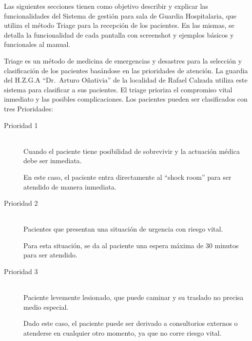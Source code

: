 Las siguientes secciones tienen como objetivo describir y explicar las funcionalidades del Sistema de gestión para sala de Guardia Hospitalaria, que utiliza el método Triage para la recepción de los pacientes. En las mismas, se detalla la funcionalidad de cada pantalla con screenshot y ejemplos básicos y funcionales al manual.

Triage es un método de medicina de emergencias y desastres para la selección y clasificación de los pacientes basándose en las prioridades de atención. La guardia del H.Z.G.A ``Dr.\ Arturo Oñativia'' de la localidad de Rafael Calzada utiliza este sistema para clasificar a sus pacientes. El triage prioriza el compromiso vital inmediato y las posibles complicaciones.
Los pacientes pueden ser clasificados con tres Prioridades:

\begin{description}
\item[Prioridad 1] \mbox{} \\ 
Cuando el paciente tiene posibilidad de sobrevivir y la actuación médica debe ser inmediata.

En este caso, el paciente entra directamente al ``shock room'' para ser atendido de manera inmediata.
\item[Prioridad 2] \mbox{} \\ 
Pacientes que presentan una situación de urgencia con riesgo vital.

Para esta situación, se da al paciente una espera máxima de 30 minutos para ser atendido.
\item[Prioridad 3] \mbox{} \\ 
Paciente levemente lesionado, que puede caminar y su traslado no precisa medio especial.

Dado este caso, el paciente puede ser derivado a consultorios externos o atenderse en cualquier otro momento, ya que no corre riesgo vital.

\end{description}

